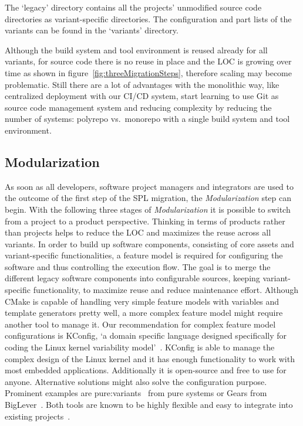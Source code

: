 The `legacy' directory contains all the projects' unmodified source code
directories as variant-specific directories. The configuration and part lists of
the variants can be found in the `variants' directory.

Although the build system and tool environment is reused already for all
variants, for source code there is no reuse in place and the LOC is growing over
time as shown in figure~\ref{fig:threeMigrationSteps}, therefore scaling may
become problematic. Still there are a lot of advantages with the monolithic way,
like centralized deployment with our CI/CD system, start learning to use Git as
source code management system and reducing complexity by reducing the number of
systems: polyrepo vs.\ monorepo with a single build system and tool environment.

\subsection{Modularization}\label{modularization}

As soon as all developers, software project managers and integrators are used to
the outcome of the first step of the SPL migration, the \textit{Modularization}
step can begin. With the following three stages of \textit{Modularization} it is
possible to switch from a project to a product perspective. Thinking in terms of
products rather than projects helps to reduce the LOC and maximizes the reuse
across all variants. In order to build up software components, consisting of
core assets and variant-specific functionalities, a feature model is required
for configuring the software and thus controlling the execution flow. The goal
is to merge the different legacy software components into configurable sources,
keeping variant-specific functionality, to maximize reuse and reduce maintenance
effort. Although CMake is capable of handling very simple feature models with
variables and template generators pretty well, a more complex feature model
might require another tool to manage it. Our recommendation for complex feature
model configurations is KConfig, `a domain specific language designed
specifically for coding the Linux kernel variability model'~\cite[page
3]{kconfigKernel}. KConfig is able to manage the complex design of the Linux
kernel and it has enough functionality to work with most embedded applications.
Additionally it is open-source and free to use for anyone. Alternative solutions
might also solve the configuration purpose. Prominent examples are
pure:variants~\cite{pureVariantsPureSystems} from pure systems or Gears from
BigLever~\cite{gearsBigLever}. Both tools are known to be highly flexible and
easy to integrate into existing projects~\cite{confsplcGrunerBKR20}.

